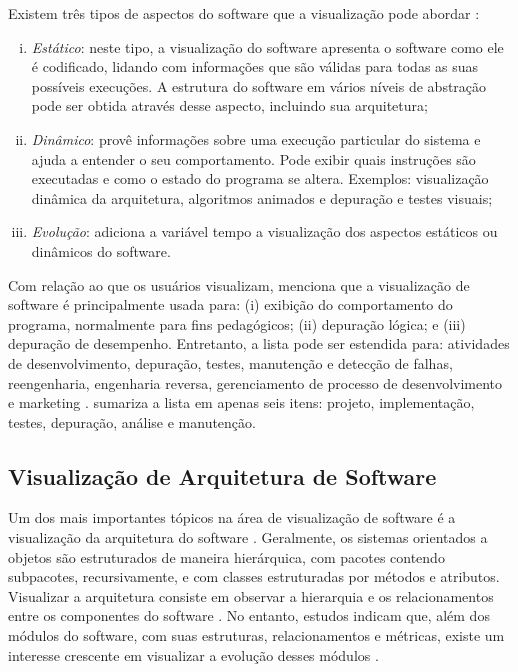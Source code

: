 Existem três tipos de aspectos do software que a visualização pode abordar \cite{Diehl2007}:
\begin{enumerate}[(i)]
	\item \textit{Estático}: neste tipo, a visualização do software apresenta o software como ele é codificado, lidando com informações que são válidas para todas as suas possíveis execuções. A estrutura do software em vários níveis de abstração pode ser obtida através desse aspecto, incluindo sua arquitetura;
	\item \textit{Dinâmico}: provê informações sobre uma execução particular do sistema e ajuda a entender o seu comportamento. Pode exibir quais instruções são executadas e como o estado do programa se altera. Exemplos: visualização dinâmica da arquitetura, algoritmos animados e depuração e testes visuais;
	\item \textit{Evolução}: adiciona a variável tempo a visualização dos aspectos estáticos ou dinâmicos do software.
\end{enumerate}

Com relação ao que os usuários visualizam, \citeauthor{Gomez-Henriquez2001a} menciona que a visualização de software é principalmente usada para: (i) exibição do comportamento do programa, normalmente para fins pedagógicos; (ii) depuração lógica; e (iii) depuração de desempenho. Entretanto, a lista pode ser estendida para: atividades de desenvolvimento, depuração, testes, manutenção e detecção de falhas, reengenharia, engenharia reversa, gerenciamento de processo de desenvolvimento e marketing \cite{Maletic2002}. \citeauthor{Diehl2007} sumariza a lista em apenas seis itens: projeto, implementação, testes, depuração, análise e manutenção.

\subsection{Visualização de Arquitetura de Software} \label{subsec:visualizacao-arquitetura-software}

Um dos mais importantes tópicos na área de visualização de software é a visualização da arquitetura do software \cite{Ghanam2008}\cite{Denford2002}\cite{Gallagher2005}\cite{Gallagher2008}. Geralmente, os sistemas orientados a objetos são estruturados de maneira hierárquica, com pacotes contendo subpacotes, recursivamente, e com classes estruturadas por métodos e atributos. Visualizar a arquitetura consiste em observar a hierarquia e os relacionamentos entre os componentes do software \cite{Caserta2011}. No entanto, estudos indicam que, além dos módulos do software, com suas estruturas, relacionamentos e métricas, existe um interesse crescente em visualizar a evolução desses módulos \cite{Ambros2007}.

